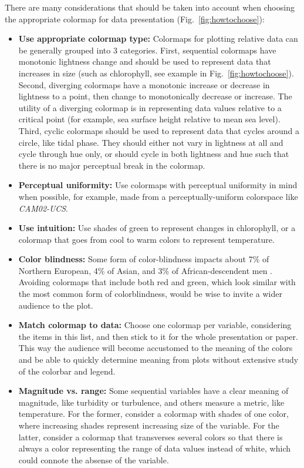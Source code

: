 \documentclass[10pt,journal,compsoc]{IEEEtran}
\begin{document}
There are many considerations that should be taken into account when choosing the appropriate colormap for data presentation (Fig.~\ref{fig:howtochoose}):
\begin{itemize}
	\item \textbf{Use appropriate colormap type:} Colormaps for plotting relative data can be generally grouped into 3 categories. First, sequential colormaps have monotonic lightness change and should be used to represent data that increases in size (such as chlorophyll, see example in Fig.~\ref{fig:howtochoose}). Second, diverging colormaps have a monotonic increase or decrease in lightness to a point, then change to monotonically decrease or increase. The utility of a diverging colormap is in representing data values relative to a critical point (for example, sea surface height relative to mean sea level). Third, cyclic colormaps should be used to represent data that cycles around a circle, like tidal phase. They should either not vary in lightness at all and cycle through hue only, or should cycle in both lightness and hue such that there is no major perceptual break in the colormap.
	\item \textbf{Perceptual uniformity:} Use colormaps with perceptual uniformity in mind when possible, for example, made from a perceptually-uniform colorspace like \textit{CAM02-UCS}.
	\item \textbf{Use intuition:} Use shades of green to represent changes in chlorophyll, or a colormap that goes from cool to warm colors to represent temperature.
	\item \textbf{Color blindness:} Some form of color-blindness impacts about 7\% of Northern European, 4\% of Asian, and 3\% of African-descendent men \citep{sharpe1999opsin}. Avoiding colormaps that include both red and green, which look similar with the most common form of colorblindness, would be wise to invite a wider audience to the plot.
	\item \textbf{Match colormap to data:} Choose one colormap per variable, considering the items in this list, and then stick to it for the whole presentation or paper. This way the audience will become accustomed to the meaning of the colors and be able to quickly determine meaning from plots without extensive study of the colorbar and legend.
	\item \textbf{Magnitude vs. range:} Some sequential variables have a clear meaning of magnitude, like turbidity or turbulence, and others measure a metric, like temperature. For the former, consider a colormap with shades of one color, where increasing shades represent increasing size of the variable. For the latter, consider a colormap that transverses several colors so that there is always a color representing the range of data values instead of white, which could connote the absense of the variable.
\end{itemize}
\end{document}
